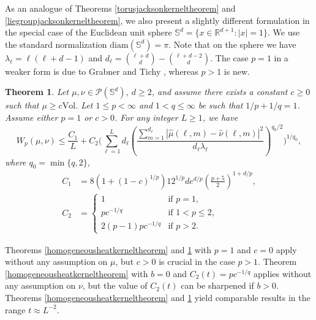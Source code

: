\documentclass[11pt,a4paper]{article}
\newtheorem{thm}{Theorem}
\theoremstyle{definition}
\begin{document}
As an analogue of Theorems \ref{torusjacksonkerneltheorem} and \ref{liegroupjacksonkerneltheorem}, we also present a slightly different formulation in the special case of the Euclidean unit sphere $\mathbb{S}^d=\{ x \in \mathbb{R}^{d+1} : |x|=1 \}$. We use the standard normalization $\mathrm{diam}(\mathbb{S}^d)=\pi$. Note that on the sphere we have $\lambda_{\ell}=\ell (\ell+d-1)$ and $d_{\ell}=\binom{\ell+d}{d} - \binom{\ell+d-2}{d}$. The case $p=1$ in a weaker form is due to Grabner and Tichy \cite[Theorem 1]{GT}, whereas $p>1$ is new.
\begin{thm}\label{sphereprojectionkerneltheorem} Let $\mu, \nu \in \mathcal{P}(\mathbb{S}^d)$, $d \ge 2$, and assume there exists a constant $c \ge 0$ such that $\mu \ge c \mathrm{Vol}$. Let $1 \le p < \infty$ and $1<q \le \infty$ be such that $1/p+1/q=1$. Assume either $p=1$ or $c>0$. For any integer $L \ge 1$, we have
\[ W_p(\mu, \nu) \le \frac{C_1}{L} + C_2 \Bigg( \sum_{\ell=1}^L d_{\ell} \left( \frac{\sum_{m=1}^{d_{\ell}} |\widehat{\mu}(\ell,m) - \widehat{\nu}(\ell,m)|^2}{d_{\ell} \lambda_{\ell}} \right)^{q_0/2} \Bigg)^{1/q_0} , \]
where $q_0=\min \{ q, 2 \}$,
\[ \begin{split} C_1 &= 8 (1+(1-c)^{1/p}) 12^{1/p} d e^{d/p} \left( \frac{p+5}{2} \right)^{1+d/p}, \\ C_2 &=\left\{ \begin{array}{ll} 1 & \textrm{if } p=1, \\ p c^{-1/q} & \textrm{if } 1<p \le 2, \\ 2(p-1)p c^{-1/q} & \textrm{if } p>2. \end{array} \right. \end{split} \]
\end{thm}

Theorems \ref{homogeneousheatkerneltheorem} and \ref{sphereprojectionkerneltheorem} with $p=1$ and $c=0$ apply without any assumption on $\mu$, but $c>0$ is crucial in the case $p>1$. Theorem \ref{homogeneousheatkerneltheorem} with $b=0$ and $C_2(t)=pc^{-1/q}$ applies without any assumption on $\nu$, but the value of $C_2 (t)$ can be sharpened if $b>0$. Theorems \ref{homogeneousheatkerneltheorem} and \ref{sphereprojectionkerneltheorem} yield comparable results in the range $t \approx L^{-2}$.
\end{document}
